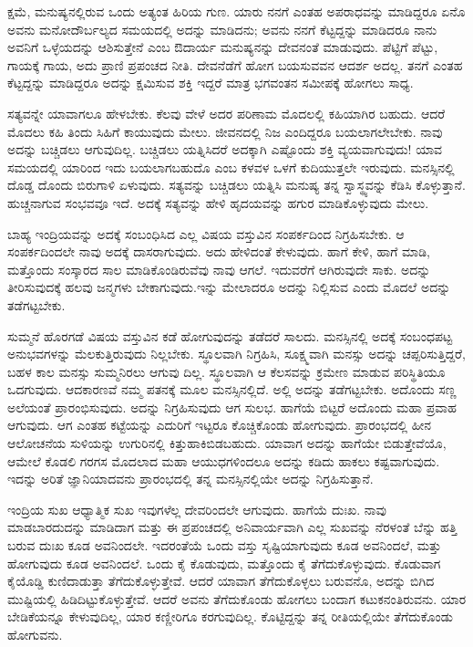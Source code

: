 ಕ್ಷಮೆ, ಮನುಷ್ಯನಲ್ಲಿರುವ ಒಂದು ಅತ್ಯಂತ ಹಿರಿಯ ಗುಣ. ಯಾರು ನನಗೆ ಎಂತಹ ಅಪರಾಧವನ್ನು ಮಾಡಿದ್ದರೂ ಏನೊ ಅವನು ಮನೋದೌರ್ಬಲ್ಯದ ಸಮಯದಲ್ಲಿ ಅದನ್ನು ಮಾಡಿದನು; ಅವನು ನನಗೆ ಕೆಟ್ಟದ್ದನ್ನು ಮಾಡಿದರೂ ನಾನು ಅವನಿಗೆ ಒಳ್ಳೆಯದನ್ನು ಆಶಿಸುತ್ತೇನೆ ಎಂಬ ಔದಾರ್ಯ ಮನುಷ್ಯನನ್ನು ದೇವನಂತೆ ಮಾಡುವುದು. ಪೆಟ್ಟಿಗೆ ಪೆಟ್ಟು, ಗಾಯಕ್ಕೆ ಗಾಯ, ಅದು ಪ್ರಾಣಿ ಪ್ರಪಂಚದ ನೀತಿ. ದೇವನೆಡೆಗೆ ಹೋಗ ಬಯಸುವವನ ಆದರ್ಶ ಅದಲ್ಲ. ತನಗೆ ಎಂತಹ ಕೆಟ್ಟದ್ದನ್ನು ಮಾಡಿದ್ದರೂ ಅದನ್ನು ಕ್ಷಮಿಸುವ ಶಕ್ತಿ ಇದ್ದರೆ ಮಾತ್ರ ಭಗವಂತನ ಸಮೀಪಕ್ಕೆ ಹೋಗಲು ಸಾಧ್ಯ.

ಸತ್ಯವನ್ನೇ ಯಾವಾಗಲೂ ಹೇಳಬೇಕು. ಕೆಲವು ವೇಳೆ ಅದರ ಪರಿಣಾಮ ಮೊದಲಲ್ಲಿ ಕಹಿಯಾಗಿರ ಬಹುದು. ಆದರೆ ಮೊದಲು ಕಹಿ ತಿಂದು ಸಿಹಿಗೆ ಕಾಯುವುದು ಮೇಲು. ಜೀವನದಲ್ಲಿ ನಿಜ ಎಂದಿದ್ದರೂ ಬಯಲಾಗಲೇಬೇಕು. ನಾವು ಅದನ್ನು ಬಚ್ಚಿಡಲು ಆಗುವುದಿಲ್ಲ. ಬಚ್ಚಿಡಲು ಯತ್ನಿಸಿದರೆ ಅದಕ್ಕಾಗಿ ಎಷ್ಟೊಂದು ಶಕ್ತಿ ವ್ಯಯವಾಗುವುದು! ಯಾವ ಸಮಯದಲ್ಲಿ ಯಾರಿಂದ ಇದು ಬಯಲಾಗಬಹುದೊ ಎಂಬ ಕಳವಳ ಒಳಗೆ ಕುದಿಯುತ್ತಲೇ ಇರುವುದು. ಮನಸ್ಸಿನಲ್ಲಿ ದೊಡ್ಡ ದೊಂದು ಬಿರುಗಾಳಿ ಏಳುವುದು. ಸತ್ಯವನ್ನು ಬಚ್ಚಿಡಲು ಯತ್ನಿಸಿ ಮನುಷ್ಯ ತನ್ನ ಸ್ವಾಸ್ಥ್ಯವನ್ನು ಕೆಡಿಸಿ ಕೊಳ್ಳುತ್ತಾನೆ. ಹುಚ್ಚನಾಗುವ ಸಂಭವವೂ ಇದೆ. ಅದಕ್ಕೆ ಸತ್ಯವನ್ನು ಹೇಳಿ ಹೃದಯವನ್ನು ಹಗುರ ಮಾಡಿಕೊಳ್ಳುವುದು ಮೇಲು.

ಬಾಹ್ಯ ಇಂದ್ರಿಯವನ್ನು ಅದಕ್ಕೆ ಸಂಬಂಧಿಸಿದ ಎಲ್ಲ ವಿಷಯ ವಸ್ತುವಿನ ಸಂಪರ್ಕದಿಂದ ನಿಗ್ರಹಿಸಬೇಕು. ಆ ಸಂಪರ್ಕದಿಂದಲೇ ನಾವು ಅದಕ್ಕೆ ದಾಸರಾಗುವುದು. ಅದು ಹೇಳಿದಂತೆ ಕೇಳುವುದು. ಹಾಗೆ ಕೇಳಿ, ಹಾಗೆ ಮಾಡಿ, ಮತ್ತೊಂದು ಸಂಸ್ಕಾರದ ಸಾಲ ಮಾಡಿಕೊಂಡಿರುವೆವು ನಾವು ಆಗಲೆ. ಇದುವರೆಗೆ ಆಗಿರುವುದೇ ಸಾಕು. ಅದನ್ನು ತೀರಿಸುವುದಕ್ಕೆ ಹಲವು ಜನ್ಮಗಳು ಬೇಕಾಗುವುದು.ಇನ್ನು ಮೇಲಾದರೂ ಅದನ್ನು ನಿಲ್ಲಿಸುವ ಎಂದು ಮೊದಲೆ ಅದನ್ನು ತಡೆಗಟ್ಟಬೇಕು.

ಸುಮ್ಮನೆ ಹೊರಗಡೆ ವಿಷಯ ವಸ್ತುವಿನ ಕಡೆ ಹೋಗುವುದನ್ನು ತಡೆದರೆ ಸಾಲದು. ಮನಸ್ಸಿನಲ್ಲಿ ಅದಕ್ಕೆ ಸಂಬಂಧಪಟ್ಟ ಅನುಭವಗಳನ್ನು ಮೆಲಕುತ್ತಿರುವುದು ನಿಲ್ಲಬೇಕು. ಸ್ಥೂಲವಾಗಿ ನಿಗ್ರಹಿಸಿ, ಸೂಕ್ಷ್ಮವಾಗಿ ಮನಸ್ಸು ಅದನ್ನು ಚಪ್ಪರಿಸುತ್ತಿದ್ದರೆ, ಬಹಳ ಕಾಲ ಮನಸ್ಸು ಸುಮ್ಮನಿರಲು ಆಗುವು ದಿಲ್ಲ. ಸ್ಥೂಲವಾಗಿ ಆ ಕೆಲಸವನ್ನು ಕ್ರಮೇಣ ಮಾಡುವ ಪರಿಸ್ಥಿತಿಯೂ ಒದಗುವುದು. ಆದಕಾರಣವೆ ನಮ್ಮ ಪತನಕ್ಕೆ ಮೂಲ ಮನಸ್ಸಿನಲ್ಲಿದೆ. ಅಲ್ಲಿ ಅದನ್ನು ತಡೆಗಟ್ಟಬೇಕು. ಅದೊಂದು ಸಣ್ಣ ಅಲೆಯಂತೆ ಪ್ರಾರಂಭಿಸುವುದು. ಅದನ್ನು ನಿಗ್ರಹಿಸುವುದು ಆಗ ಸುಲಭ. ಹಾಗೆಯೆ ಬಿಟ್ಟರೆ ಅದೊಂದು ಮಹಾ ಪ್ರವಾಹ ಆಗುವುದು. ಆಗ ಎಂತಹ ಕಟ್ಟೆಯನ್ನು ಎದುರಿಗೆ ಇಟ್ಟರೂ ಕೊಚ್ಚಿಕೊಂಡು ಹೋಗುವುದು. ಪ್ರಾರಂಭದಲ್ಲಿ ಹೀನ ಆಲೋಚನೆಯ ಸುಳಿಯನ್ನು ಉಗುರಿನಲ್ಲಿ ಕಿತ್ತುಹಾಕಿಬಿಡಬಹುದು. ಯಾವಾಗ ಅದನ್ನು ಹಾಗೆಯೇ ಬಿಡುತ್ತೇವೆಯೊ, ಆಮೇಲೆ ಕೊಡಲಿ ಗರಗಸ ಮೊದಲಾದ ಮಹಾ ಆಯುಧಗಳಿಂದಲೂ ಅದನ್ನು ಕಡಿದು ಹಾಕಲು ಕಷ್ಟವಾಗುವುದು. ಇದನ್ನು ಅರಿತೆ ಜ್ಞಾನಿಯಾದವನು ಪ್ರಾರಂಭದಲ್ಲಿ ತನ್ನ ಮನಸ್ಸಿನಲ್ಲಿಯೇ ಅದನ್ನು ನಿಗ್ರಹಿಸುತ್ತಾನೆ. 

ಇಂದ್ರಿಯ ಸುಖ ಆಧ್ಯಾತ್ಮಿಕ ಸುಖ ಇವುಗಳೆಲ್ಲ ದೇವರಿಂದಲೇ ಆಗುವುದು. ಹಾಗೆಯೆ ದುಃಖ. ನಾವು ಮಾಡಬಾರದುದನ್ನು ಮಾಡಿದಾಗ ಮತ್ತು ಈ ಪ್ರಪಂಚದಲ್ಲಿ ಅನಿವಾರ್ಯವಾಗಿ ಎಲ್ಲ ಸುಖವನ್ನು ನೆರಳಂತೆ ಬೆನ್ನು ಹತ್ತಿ ಬರುವ ದುಃಖ ಕೂಡ ಅವನಿಂದಲೇ. ಇದರಂತೆಯೆ ಒಂದು ವಸ್ತು ಸೃಷ್ಟಿಯಾಗುವುದು ಕೂಡ ಅವನಿಂದಲೆ, ಮತ್ತು ಹೋಗುವುದು ಕೂಡ ಅವನಿಂದಲೆ. ಒಂದು ಕೈ ಕೊಡುವುದು, ಮತ್ತೊಂದು ಕೈ ತೆಗೆದುಕೊಳ್ಳುವುದು. ಕೊಡುವಾಗ ಕೈಯೊಡ್ಡಿ ಕುಣಿದಾಡುತ್ತಾ ತೆಗೆದುಕೊಳ್ಳುತ್ತೇವೆ. ಆದರೆ ಯಾವಾಗ ತೆಗೆದುಕೊಳ್ಳಲು ಬರುವನೊ, ಅದನ್ನು ಬಿಗಿದ ಮುಷ್ಟಿಯಲ್ಲಿ ಹಿಡಿದಿಟ್ಟುಕೊಳ್ಳುತ್ತೇವೆ. ಆದರೆ ಅವನು ತೆಗೆದುಕೊಂಡು ಹೋಗಲು ಬಂದಾಗ ಕಟುಕನಂತಿರುವನು. ಯಾರ ಬೇಡಿಕೆಯನ್ನೂ ಕೇಳುವುದಿಲ್ಲ, ಯಾರ ಕಣ್ಣೀರಿಗೂ ಕರಗುವುದಿಲ್ಲ. ಕೊಟ್ಟಿದ್ದನ್ನು ತನ್ನ ರೀತಿಯಲ್ಲಿಯೇ ತೆಗೆದುಕೊಂಡು ಹೋಗುವನು.

